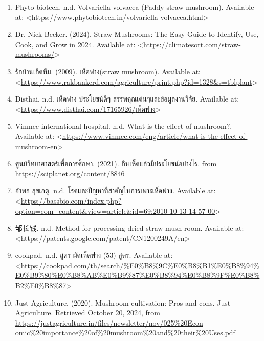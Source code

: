 \begin{enumerate}
  \item Phyto biotech. n.d. Volvariella volvacea (Paddy straw mushroom). Available at: <\url{https://www.phytobiotech.in/volvariella-volvacea.html}>
  \item Dr. Nick Becker. (2024). Straw Mushrooms: The Easy Guide to Identify, Use, Cook, and Grow in 2024. Available at: <\url{https://climatesort.com/straw-mushrooms/}>
  \item {\T รักบ้านเกิดทีม}. (2009). {\T เห็ดฟาง}(straw mushroom). Available at: <\url{https://www.rakbankerd.com/agriculture/print.php?id=1328&s=tblplant}>
  \item Disthai. n.d. {\T เห็ดฟาง ประโยชน์ดีๆ สรรพคุณเด่นๆและข้อมูลงานวิจัย}. Available at: <\href{https://www.disthai.com/17165926/เห็ดฟาง}{https://www.disthai.com/17165926/{\T เห็ดฟาง}}>
  \item Vinmec international hospital. n.d. What is the effect of mushroom?. Available at: <\url{https://www.vinmec.com/eng/article/what-is-the-effect-of-mushroom-en}>
  \item {\T ศูนย์วิทยาศาสตร์เพื่อการศึกษา}. (2021). {\T กินเห็ดแล้วมีประโยชน์อย่างไร}. from \url{https://sciplanet.org/content/8846}
  \item {\T อำพล สุขเกตุ}. n.d. {\T โรคและปัญหาที่สำคัญในการเพาะเห็ดฟาง}. Available at: <\url{https://bassbio.com/index.php?option=com\_content&view=article&id=69:2010-10-13-14-57-00}>
  \item {\fontsize{16}{24}\selectfont 邹长钱}. n.d. Method for processing dried straw mush-room. Available at: <\url{https://patents.google.com/patent/CN1200249A/en}>
  \item cookpad. n.d. {\T สูตร ผัดเห็ดฟาง} (53) {\T สูตร}. Available at: <\url{https://cookpad.com/th/search/%E0%B8%9C%E0%B8%B1%E0%B8%94%E0%B9%80%E0%B8%AB%E0%B9%87%E0%B8%94%E0%B8%9F%E0%B8%B2%E0%B8%87}>
  \item Just Agriculture. (2020). Mushroom cultivation: Pros and cons. Just Agriculture. Retrieved October 20, 2024, from \url{https://justagriculture.in/files/newsletter/nov/025\%20Econ omic\%20importance\%20of\%20mushroom\%20and\%20their\%20Uses.pdf}
\end{enumerate}
